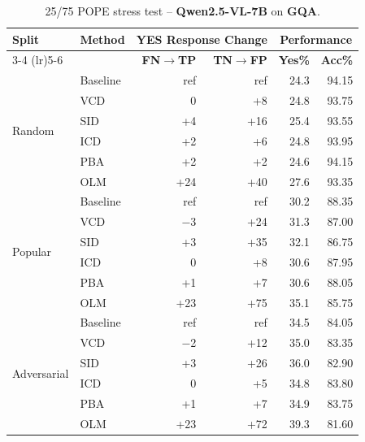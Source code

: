 \documentclass[11pt]{article}
\begin{document}
\begin{table}[ht]
\centering
\caption{25/75 POPE stress test -- \textbf{Qwen2.5-VL-7B} on \textbf{GQA}.}
\label{tab:25_75_qwen_gqa}
\setlength{\tabcolsep}{6pt}
\renewcommand{\arraystretch}{1.1}
\begin{tabular}{l|l|rr|rr}
\toprule
\multirow{2}{*}{\textbf{Split}} &
\multirow{2}{*}{\textbf{Method}} &
\multicolumn{2}{c|}{\textbf{YES Response Change}} &
\multicolumn{2}{c}{\textbf{Performance}} \\
\cmidrule(lr){3-4} \cmidrule(lr){5-6}
& & \textbf{FN$\to$TP} & \textbf{TN$\to$FP} & \textbf{Yes\%} & \textbf{Acc\%} \\
\midrule

\multirow{6}{*}{Random}
& Baseline & ref   & ref  & 24.3 & 94.15 \\
& VCD      & 0     & +8   & 24.8 & 93.75 \\
& SID      & +4    & +16  & 25.4 & 93.55 \\
& ICD      & +2    & +6   & 24.8 & 93.95 \\
& PBA      & +2    & +2   & 24.6 & 94.15 \\
& OLM      & +24   & +40  & 27.6 & 93.35 \\
\midrule

\multirow{6}{*}{Popular}
& Baseline & ref   & ref  & 30.2 & 88.35 \\
& VCD      & $-$3  & +24  & 31.3 & 87.00 \\
& SID      & +3    & +35  & 32.1 & 86.75 \\
& ICD      & 0     & +8   & 30.6 & 87.95 \\
& PBA      & +1    & +7   & 30.6 & 88.05 \\
& OLM      & +23   & +75  & 35.1 & 85.75 \\
\midrule

\multirow{6}{*}{Adversarial}
& Baseline & ref   & ref  & 34.5 & 84.05 \\
& VCD      & $-$2  & +12  & 35.0 & 83.35 \\
& SID      & +3    & +26  & 36.0 & 82.90 \\
& ICD      & 0     & +5   & 34.8 & 83.80 \\
& PBA      & +1    & +7   & 34.9 & 83.75 \\
& OLM      & +23   & +72  & 39.3 & 81.60 \\
\bottomrule
\end{tabular}
\end{table}

\end{document}
